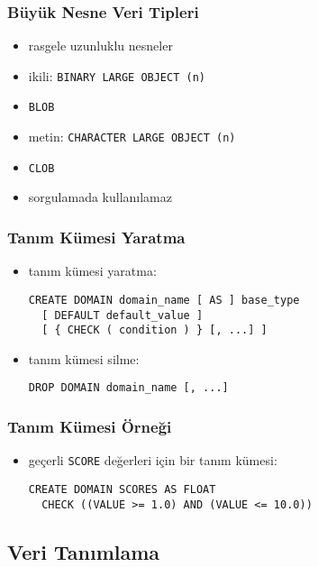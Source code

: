 \documentclass[dvipsnames]{beamer}
\theoremstyle{plain}
\begin{document}
\begin{frame}
  \frametitle{Büyük Nesne Veri Tipleri}

  \begin{itemize}
    \item rasgele uzunluklu nesneler
    
    \medskip
    \item ikili: \texttt{BINARY LARGE OBJECT (n)}
    \item \texttt{BLOB}
    
    \pause
    \medskip
    \item metin: \texttt{CHARACTER LARGE OBJECT (n)}
    \item \texttt{CLOB}

    \pause
    \medskip
    \item sorgulamada kullanılamaz  
  \end{itemize}
\end{frame}

\begin{frame}[fragile]
  \frametitle{Tanım Kümesi Yaratma}

  \begin{itemize}
  \item tanım kümesi yaratma:
  \begin{lstlisting}
CREATE DOMAIN domain_name [ AS ] base_type
  [ DEFAULT default_value ]
  [ { CHECK ( condition ) } [, ...] ]
  \end{lstlisting}
    
  \pause
  \item tanım kümesi silme:
  \begin{lstlisting}
DROP DOMAIN domain_name [, ...]
    \end{lstlisting} 
  \end{itemize}    
\end{frame}

\begin{frame}[fragile]
  \frametitle{Tanım Kümesi Örneği}
  
  \begin{itemize}
    \item geçerli \texttt{SCORE} değerleri için bir tanım kümesi:
    \begin{lstlisting}
CREATE DOMAIN SCORES AS FLOAT
  CHECK ((VALUE >= 1.0) AND (VALUE <= 10.0))
    \end{lstlisting}
  \end{itemize}
\end{frame}

\subsection{Veri Tanımlama}
\end{document}
